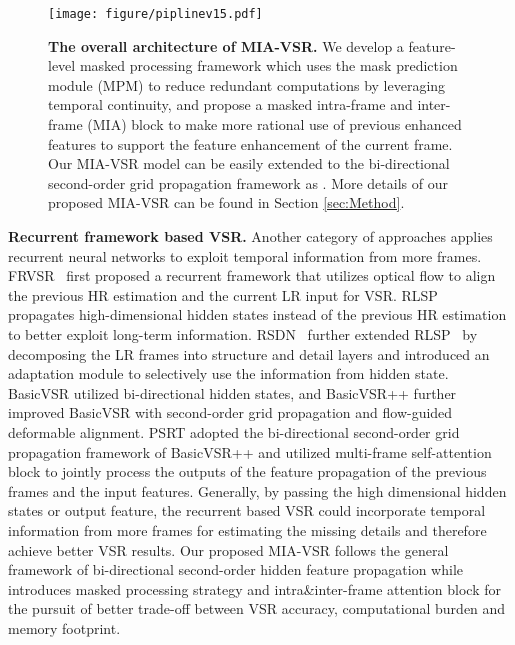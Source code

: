 \documentclass[10pt,twocolumn,letterpaper]{article}
\begin{document}
\begin{figure*}
\centering
\texttt{[image: figure/piplinev15.pdf]}
\caption{\textbf{The overall architecture of MIA-VSR.} We develop a feature-level masked processing framework which uses the mask prediction module (MPM) to reduce redundant computations by leveraging temporal continuity, and propose a masked intra-frame and inter-frame (MIA) block to make more rational use of previous enhanced features to support the feature enhancement of the current frame. Our MIA-VSR model can be easily extended to the bi-directional second-order grid propagation framework as \cite{chan2022basicvsr++}. More details of our proposed MIA-VSR can be found in Section \ref{sec:Method}.}
\label{fig1}
\end{figure*}
\vspace{\baselineskip}
\noindent\textbf{Recurrent framework based VSR.}
Another category of approaches applies recurrent neural networks to exploit temporal information from more frames.
%
FRVSR~\cite{sajjadi2018frame} first proposed a recurrent framework that utilizes optical flow to align the previous HR estimation and the current LR input for VSR.
%
%
RLSP~\cite{fuoli2019efficient} propagates high-dimensional hidden states instead of the previous HR estimation to better exploit long-term information.
%
RSDN~\cite{isobe2020video} further extended RLSP~\cite{fuoli2019efficient} by decomposing the LR frames into structure and detail layers and introduced an adaptation module to selectively use the information from hidden state.
%
BasicVSR \cite{chan2020basicvsr} utilized bi-directional hidden states, and BasicVSR++ \cite{chan2022basicvsr++} further improved BasicVSR with second-order grid propagation and flow-guided deformable alignment.
%
PSRT \cite{shi2022rethinking} adopted the bi-directional second-order grid propagation framework of BasicVSR++ and utilized multi-frame self-attention block to jointly process the outputs of the feature propagation of the previous frames and the input features.
%
Generally, by passing the high dimensional hidden states or output feature, the recurrent based VSR could incorporate temporal information from more frames for estimating the missing details and therefore achieve better VSR results.
%
Our proposed MIA-VSR follows the general framework of bi-directional second-order hidden feature propagation while introduces masked processing strategy and intra\&inter-frame attention block for the pursuit of better trade-off between VSR accuracy, computational burden and memory footprint.
\end{document}
